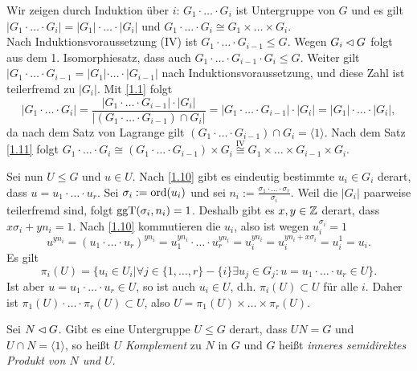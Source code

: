 \begin{beweis}
 Wir zeigen durch Induktion \"uber $i$: $G_1\cdot\ldots\cdot G_i$ ist Untergruppe von $G$ und es gilt $|G_1\cdot \ldots\cdot G_i|=|G_1|\cdot\ldots\cdot |G_i|$ und $G_1\cdot\ldots\cdot G_i \cong G_1\times\ldots\times G_i$.\\
 Nach Induktionsvoraussetzung (IV) ist $G_1\cdot\ldots\cdot G_{i-1}\leq G$. Wegen $G_i\lhd G$ folgt aus dem 1. Isomorphiesatz, dass auch $G_1\cdot\ldots\cdot G_{i-1}\cdot G_i \leq G$. Weiter gilt $|G_1\cdot\ldots\cdot G_{i-1}= |G_1|\cdot\ldots\cdot |G_{i-1}|$ nach Induktionsvoraussetzung, und diese Zahl ist teilerfremd zu $|G_i|$. Mit \ref{1.1} folgt $$|G_1\cdot\ldots\cdot G_i| = \frac{|G_1\cdot\ldots\cdot G_{i-1}|\cdot |G_i|}{|(G_1\cdot \ldots\cdot G_{i-1})\cap G_i|}=|G_1\cdot\ldots\cdot G_{i-1}|\cdot |G_i| = |G_1|\cdot\ldots\cdot |G_i|,$$ da nach dem Satz von Lagrange gilt $(G_1\cdot\ldots\cdot G_{i-1})\cap G_i=\langle 1 \rangle$.
Nach dem Satz \ref{1.11} folgt $G_1\cdot\ldots\cdot G_i \cong (G_1\cdot \ldots\cdot G_{i-1})\times G_i \stackrel{\textrm{IV}}{\cong} G_1\times \ldots\times G_{i-1}\times G_i$. 

Sei nun $U\leq G$ und $u\in U$. Nach \ref{1.10} gibt es eindeutig bestimmte $u_i\in G_i$ derart, dass $u=u_1\cdot\ldots\cdot u_r$. Sei $\sigma_i:=\operatorname{ord}(u_i)$ und sei $n_i := \frac{\sigma_1\cdot\ldots\cdot\sigma_r}{\sigma_i}$. Weil die $|G_i|$ paarweise teilerfremd sind, folgt $\operatorname{ggT}(\sigma_i, n_i)=1$. Deshalb gibt es $x, y\in \mathbb{Z}$ derart, dass $x\sigma_i + yn_i=1$. Nach \ref{1.10} kommutieren die $u_i$, also ist wegen $u_i^{\sigma_i}=1$
$$u^{yn_i}=(u_1\cdot\ldots\cdot u_r)^{yn_i}=u_1^{yn_i}\cdot\ldots\cdot u_r^{yn_i}=u_i^{yn_i}=u_i^{yn_i + x\sigma_i}=u_i^1=u_i.$$
Es gilt $$\pi_i(U)=\lbrace u_i\in U_i | \forall j\in \lbrace 1,\ldots,r \rbrace - \lbrace i \rbrace\exists u_j\in G_j:u=u_1\cdot\ldots\cdot u_r\in U\rbrace.$$
Ist aber $u=u_1\cdot\ldots\cdot u_r\in U$, so ist auch $u_i\in U$, d.h. $\pi_i(U)\subset U$ f\"ur alle $i$. Daher ist $\pi_1(U)\cdot\ldots\cdot\pi_r(U)\subset U$, also $U=\pi_1(U)\times \ldots\times \pi_r(U)$.
\end{beweis}

\begin{definition} 
 Sei $N\lhd G$. Gibt es eine Untergruppe $U\leq G$ derart, dass $UN=G$ und $U\cap N = \langle 1 \rangle$, so hei\ss{}t $U$ \emph{Komplement} zu $N$ in $G$ und $G$ hei\ss{}t \emph{inneres semidirektes Produkt von $N$ und $U$}.
\end{definition}

